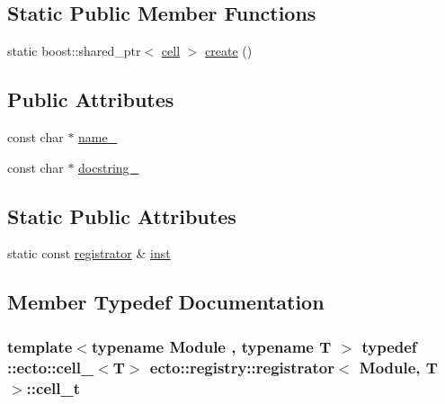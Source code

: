 \subsection*{Static Public Member Functions}
\begin{DoxyCompactItemize}
\item 
static boost\-::shared\-\_\-ptr$<$ \hyperlink{structecto_1_1cell}{cell} $>$ \hyperlink{structecto_1_1registry_1_1registrator_aa46347f24e15fcc5955523d5e2adadf7}{create} ()
\end{DoxyCompactItemize}
\subsection*{Public Attributes}
\begin{DoxyCompactItemize}
\item 
const char $\ast$ \hyperlink{structecto_1_1registry_1_1registrator_a794acc964cefc0a374129823b4ee5246}{name\-\_\-}
\item 
const char $\ast$ \hyperlink{structecto_1_1registry_1_1registrator_a6eb361c892595a3d71ab627829c07bdb}{docstring\-\_\-}
\end{DoxyCompactItemize}
\subsection*{Static Public Attributes}
\begin{DoxyCompactItemize}
\item 
static const \hyperlink{structecto_1_1registry_1_1registrator}{registrator} \& \hyperlink{structecto_1_1registry_1_1registrator_a0b0f6e3aa1718476b962a007786e7496}{inst}
\end{DoxyCompactItemize}


\subsection{Member Typedef Documentation}
\hypertarget{structecto_1_1registry_1_1registrator_ae352ebfb18c87dc7fb3f649ecbe445fa}{
\subsubsection[{cell\-\_\-t}]{\setlength{\rightskip}{0pt plus 5cm}template$<$typename Module , typename T $>$ typedef \-::{\bf ecto\-::cell\-\_\-}$<$T$>$ {\bf ecto\-::registry\-::registrator}$<$ Module, T $>$\-::{\bf cell\-\_\-t}}}\label{structecto_1_1registry_1_1registrator_ae352ebfb18c87dc7fb3f649ecbe445fa}


